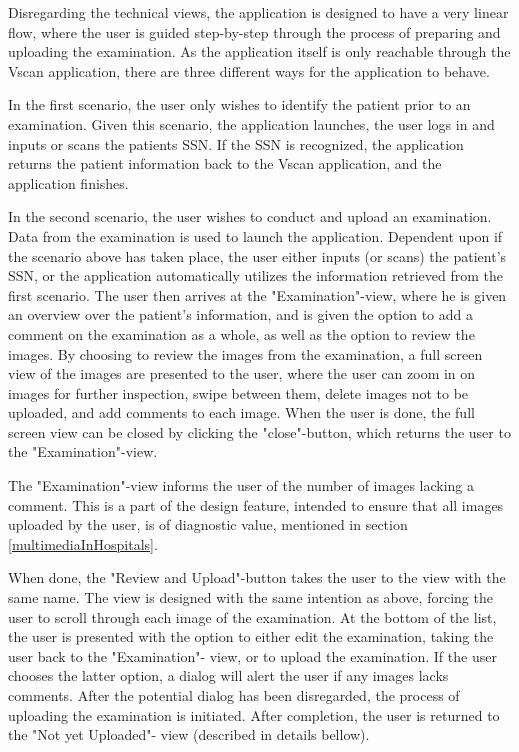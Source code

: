 Disregarding the technical views, the application is designed to have a very linear flow, where the user is guided step-by-step through the process of preparing and uploading the examination. As the application itself is only reachable through the Vscan application, there are three different ways for the application to behave. 

In the first scenario, the user only wishes to identify the patient prior to an examination. Given this scenario, the application launches, the user logs in and inputs or scans the patients SSN. If the SSN is recognized, the application returns the patient information back to the Vscan application, and the application finishes. 

In the second scenario, the user wishes to conduct and upload an examination. Data from the examination is used to launch the application. Dependent upon if the scenario above has taken place, the user either inputs (or scans) the patient's SSN, or the application automatically utilizes the information retrieved from the first scenario. The user then arrives at the "Examination"-view, where he is given an overview over the patient's information, and is given the option to add a comment on the examination as a whole, as well as the option to review the images. By choosing to review the images from the examination, a full screen view of the images are presented to the user, where the user can zoom in on images for further inspection, swipe between them, delete images not to be uploaded, and add comments to each image. When the user is done, the full screen view can be closed by clicking the "close"-button, which returns the user to the "Examination"-view. 

The "Examination"-view informs the user of the number of images lacking a comment. This is a part of the design feature, intended to ensure that all images uploaded by the user, is of diagnostic value, mentioned in section \ref{multimediaInHospitals}.

When done, the "Review and Upload"-button takes the user to the view with the same name. The view is designed with the same intention as above, forcing the user to scroll through each image of the examination. At the bottom of the list, the user is presented with the option to either edit the examination, taking the user back to the "Examination"- view, or to upload the examination. If the user chooses the latter option, a dialog will alert the user if any images lacks comments. 
After the potential dialog has been disregarded, the process of uploading the examination is initiated. After completion, the user is returned to the "Not yet Uploaded"- view (described in details bellow).

